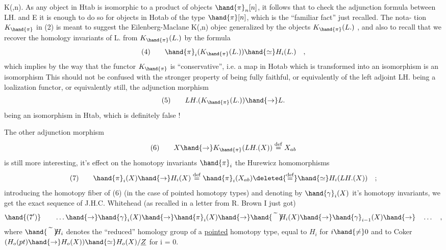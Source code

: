 K(\hand{$\pi$},n). As any object in Htab  is isomorphic to a
product of objects $\hand{\pi}_n[n]$, it follows that   to check the adjunction
formula between LH. and E it is enough to do so for objects in Hotab
of the type $\hand{\pi}[n]$, which is the ``familiar fact'' just recalled. The nota-%
tion $K_{\hand{\pi}}$ in (2) is meant to suggest the Eilenberg-Maclane K(\hand{$\pi$},n) objec
generalized by the objects $K_{\hand{\pi}}(L.)$ , and also to recall that we recover
the homology invariants of  L. from $K_{\hand{\pi}}(L.)$  by the formula
\[
(4) \qquad \hand{\pi}_i(K_{\hand{\pi}}(L.)) \hand{\simeq} H_i(L.) \quad ,
\]
which implies by the way that the functor $K_{\hand{\pi}}$ is ``conservative'', i.e.
a map in Hotab which is transformed into an isomorphism is an isomorphism
This should not be confused with the stronger property of being fully
faithful, or equivalently of the left adjoint LH. being a loalization
functor, or equivalently still, the adjunction morphism
\[
(5) \qquad LH.(K_{\hand{\pi}}(L.)) \hand{\to} L.
\]
being an isomorphism in Htab, which is definitely false !

The other adjunction morphism
\[
(6) \qquad X \hand{\to} K_{\hand{\pi}}(LH.(X)) \overset{\mathrm{def}}{=} X_{ab}
\]
is still more interesting, it's effect on the homotopy invariants $\hand{\pi}_i$ 
the Hurewicz  homomorphisms
\[
(7) \qquad \hand{\pi}_i(X) \hand{\to} H_i(X) \overset{\mathrm{def}}{=} \hand{\pi}_i(X_{ab}) \deleted{\overset{\mathrm{def}}{=}}\hand{\simeq} H_i(LH.(X)) \quad ;
\]
 introducing the homotopy fiber of (6) (in the case of pointed
homotopy types) and denoting by $\hand{\gamma}_i(X)$ it's homotopy invariants, we get
the exact sequence of J.H.C. Whitehead (as recalled in a letter from R.
Brown I just got)
\[
\hand{(7')} \qquad \dots \hand{\to} \hand{\gamma}_i(X) \hand{\to} \hand{\pi}_i(X) \hand{\to} \hand{\widetilde{\phantom{H}}}\!\!H_i(X) \hand{\to} \hand{\gamma}_{i-1}(X) \hand{\to} \quad \dots \quad ,
\]
where $\hand{\widetilde{\phantom{H}}}\!\!H_i$ denotes the ``reduced'' homology group of a \uline{pointed} homotopy
type, equal to $H_i$ for $i\hand{\neq}0$ and to Coker $(H_o(pt) \hand{\to} H_o(X)) \hand{\simeq} H_o(X)/\underline{Z}$ for
i = 0.


